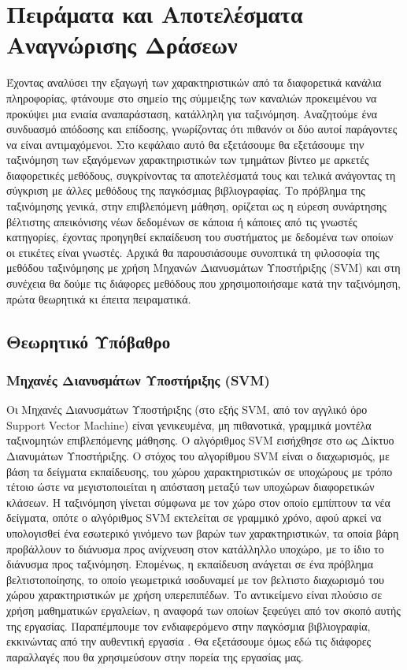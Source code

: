 \documentclass[11pt,a4paper,english,greek,twoside]{../Thesis}
\begin{document}
\chapter{Πειράματα και Αποτελέσματα Αναγνώρισης Δράσεων}
Έχοντας αναλύσει την εξαγωγή των χαρακτηριστικών από τα διαφορετικά κανάλια πληροφορίας, φτάνουμε στο σημείο της σύμμειξης των καναλιών προκειμένου να προκύψει μια ενιαία αναπαράσταση, κατάλληλη για ταξινόμηση. Αναζητούμε ένα συνδυασμό απόδοσης και επίδοσης, γνωρίζοντας ότι πιθανόν οι δύο αυτοί παράγοντες να είναι αντιμαχόμενοι. Στο κεφάλαιο αυτό θα εξετάσουμε θα εξετάσουμε την ταξινόμηση των εξαγόμενων χαρακτηριστικών των τμημάτων βίντεο με αρκετές διαφορετικές μεθόδους, συγκρίνοντας τα αποτελέσματά τους και τελικά ανάγοντας τη σύγκριση με άλλες μεθόδους της παγκόσμιας βιβλιογραφίας. Το πρόβλημα της ταξινόμησης γενικά, στην επιβλεπόμενη μάθηση, ορίζεται ως η εύρεση συνάρτησης βέλτιστης απεικόνισης νέων δεδομένων σε κάποια ή κάποιες από τις γνωστές κατηγορίες, έχοντας προηγηθεί εκπαίδευση του συστήματος με δεδομένα των οποίων οι ετικέτες είναι γνωστές. Αρχικά θα παρουσιάσουμε συνοπτικά τη φιλοσοφία της μεθόδου ταξινόμησης με χρήση Μηχανών Διανυσμάτων Υποστήριξης (SVM) και στη συνέχεια θα δούμε τις διάφορες μεθόδους που χρησιμοποιήσαμε κατά την ταξινόμηση, πρώτα θεωρητικά κι έπειτα πειραματικά.


\section{Θεωρητικό Υπόβαθρο}
\subsection{Μηχανές Διανυσμάτων Υποστήριξης (SVM)}
Οι Μηχανές Διανυσμάτων Υποστήριξης (στο εξής SVM, από τον αγγλικό όρο Support Vector Machine) είναι γενικευμένα, μη πιθανοτικά, γραμμικά μοντέλα ταξινομητών επιβλεπόμενης μάθησης. Ο αλγόριθμος SVM εισήχθησε στο \cite{cortes_1995} ως Δίκτυο Διανυμάτων Υποστήριξης. Ο στόχος του αλγορίθμου SVM είναι ο διαχωρισμός, με βάση τα δείγματα εκπαίδευσης, του χώρου χαρακτηριστικών σε υποχώρους με τρόπο τέτοιο ώστε να μεγιστοποιείται η απόσταση μεταξύ των υποχώρων διαφορετικών κλάσεων. Η ταξινόμηση γίνεται σύμφωνα με τον χώρο στον οποίο εμπίπτουν τα νέα δείγματα, οπότε ο αλγόριθμος SVM εκτελείται σε γραμμικό χρόνο, αφού αρκεί να υπολογισθεί ένα εσωτερικό γινόμενο των βαρών των χαρακτηριστικών, τα οποία βάρη προβάλλουν το διάνυσμα προς ανίχνευση στον κατάλληλλο υποχώρο, με το ίδιο το διάνυσμα προς ταξινόμηση. Επομένως, η εκπαίδευση ανάγεται σε ένα πρόβλημα βελτιστοποίησης, το οποίο γεωμετρικά ισοδυναμεί με τον βελτιστο διαχωρισμό του χώρου χαρακτηριστικών με χρήση υπερεπιπέδων. Το αντικείμενο είναι πλούσιο σε χρήση μαθηματικών εργαλείων, η αναφορά των οποίων ξεφεύγει από τον σκοπό αυτής της εργασίας. Παραπέμπουμε τον ενδιαφερόμενο στην παγκόσμια βιβλιογραφία, εκκινώντας από την αυθεντική εργασία \cite{cortes_1995}. Θα εξετάσουμε όμως εδώ τις διάφορες παραλλαγές που θα χρησιμεύσουν στην πορεία της εργασίας μας.
\end{document}
